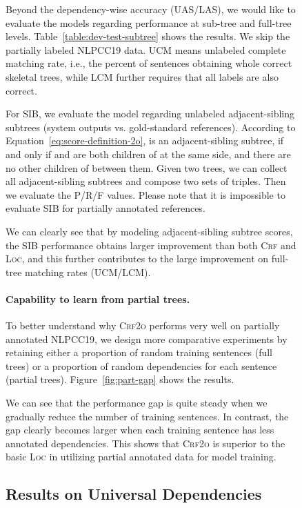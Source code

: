 \documentclass[11pt,a4paper]{article}
\begin{document}
\begin{figure}[tb]
\begin{center}
\begin{dependency}
\begin{deptext}[column sep=.16cm]
 
Beyond the dependency-wise accuracy (UAS/LAS), we
would like to evaluate the models regarding performance at sub-tree and full-tree levels.
Table~\ref{table:dev-test-subtree} shows the results. We skip the partially labeled NLPCC19 data.
UCM means unlabeled complete matching rate, i.e., the percent of sentences obtaining whole correct skeletal trees, while
LCM further requires that all labels are also correct.


For SIB, we evaluate the model regarding unlabeled adjacent-sibling subtrees (system outputs vs. gold-standard references). According to Equation~\ref{eq:score-definition-2o},
 is an adjacent-sibling subtree, if and only if  and  are both children of  at the same side, and there are no other children of  between them.
Given two trees, we can collect all adjacent-sibling subtrees and compose two sets of triples.
Then we evaluate the P/R/F values.
Please note that it is impossible to evaluate SIB for partially annotated references.

We can clearly see that by modeling adjacent-sibling subtree scores,
the SIB performance obtains larger improvement than both \textsc{Crf} and \textsc{Loc},
and this further contributes to the large improvement on full-tree matching rates (UCM/LCM).





\paragraph{Capability to learn from partial trees.}

To better understand why \textsc{Crf2o} performs very well on partially annotated NLPCC19,
we design more comparative experiments by retaining either a proportion of random training sentences (full trees) or a proportion of random dependencies for each sentence (partial trees).
Figure~\ref{fig:part-gap} shows the results.


We can see that the performance gap is quite steady
when we gradually reduce the number of training sentences.
In contrast, the gap clearly becomes larger when each training sentence has less annotated dependencies.
This shows that \textsc{Crf2o} is superior to the basic \textsc{Loc} in
utilizing partial annotated data for model training.








 \subsection{Results on Universal Dependencies}


\end{deptext}
\end{dependency}
\end{center}
\end{figure}
\end{document}
